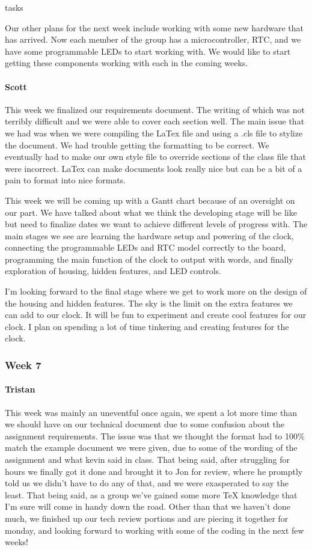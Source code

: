 tasks\documentclass[onecolumn, draftclsnofoot,10pt, compsoc]{IEEEtran}
\begin{document}
Our other plans for the next week include working with some new hardware that has arrived. Now each member of the group has a microcontroller, RTC, and we have some programmable LEDs to start working with. We would like to start getting these components working with each in the coming weeks.
\paragraph{Scott}
This week we finalized our requirements document. The writing of which was not terribly difficult and we were able to cover each section well. The main issue that we had was when we were compiling the LaTex file and using a .cls file to stylize the document. We had trouble getting the formatting to be correct. We eventually had to make our own style file to override sections of the class file that were incorrect. LaTex can make documents look really nice but can be a bit of a pain to format into nice formats.

This week we will be coming up with a Gantt chart because of an oversight on our part. We have talked about what we think the developing stage will be like but need to finalize dates we want to achieve different levels of progress with. The main stages we see are learning the hardware setup and powering of the clock, connecting the programmable LEDs and RTC model correctly to the board, programming the main function of the clock to output with words, and finally exploration of housing, hidden features, and LED controls.

I'm looking forward to the final stage where we get to work more on the design of the housing and hidden features. The sky is the limit on the extra features we can add to our clock. It will be fun to experiment and create cool features for our clock. I plan on spending a lot of time tinkering and creating features for the clock.
\subsubsection{Week 7}
\paragraph{Tristan}
This week was mainly an uneventful once again, we spent a lot more time than we should have on our technical document due to some confusion about the assignment requirements. The issue was that we thought the format had to 100\% match the example document we were given, due to some of the wording of the assignment and what kevin said in class. That being said, after struggling for hours we finally got it done and brought it to Jon for review, where he promptly told us we didn't have to do any of that, and we were exasperated to say the least. That being said, as a group we've gained some more TeX knowledge that I'm sure will come in handy down the road. Other than that we haven't done much, we finished up our tech review portions and are piecing it together for monday, and looking forward to working with some of the coding in the next few weeks!
\end{document}
